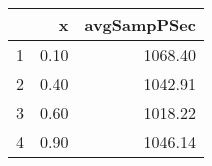 \begin{table}[h]
\centering
\begin{tabular}{rrr}
  \hline
 & x & avgSampPSec \\ 
  \hline
1 & 0.10 & 1068.40 \\ 
   \hline
2 & 0.40 & 1042.91 \\ 
   \hline
3 & 0.60 & 1018.22 \\ 
   \hline
4 & 0.90 & 1046.14 \\ 
   \hline
\end{tabular}
\end{table}
